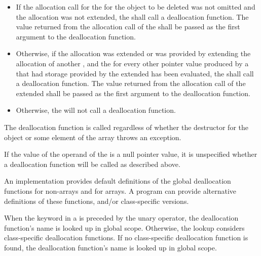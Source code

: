 \begin{itemize}
\item
If the allocation call for the  for the object to
be deleted was not omitted and the allocation was not extended, the
 shall call a deallocation
function. The value returned from the
allocation call of the  shall be passed as the
first argument to the deallocation function.

\item
Otherwise, if the allocation was extended or was provided by extending the
allocation of another , and the
 for every other pointer value produced by a
 that had storage provided by the extended
 has been evaluated, the
 shall call a deallocation function. The value
returned from the allocation call of the extended 
shall be passed as the first argument to the deallocation function.

\item
Otherwise, the  will not call a
deallocation function.
\end{itemize}
\begin{note}
The deallocation function is called regardless of whether the destructor
for the object or some element of the array throws an exception.
\end{note}
If the value of the operand of the  is a
null pointer value, it is unspecified whether a deallocation function will be
called as described above.

\pnum
\begin{note}
An implementation provides default definitions of the global
deallocation functions  for
non-arrays and
%
 for arrays. A \Cpp{}
program can provide alternative definitions of these
functions, and/or class-specific
versions.
\end{note}

\pnum
When the keyword  in a  is
preceded by the unary \tcode{::} operator, the deallocation function's name is looked
up in global scope. Otherwise, the lookup considers class-specific deallocation
functions. If no class-specific deallocation function is found,
the deallocation function's name is looked up in global scope.


